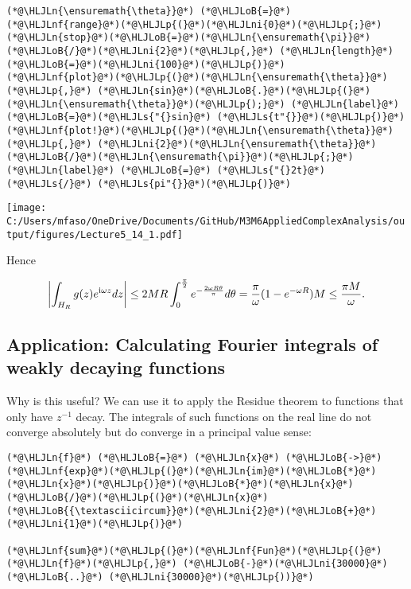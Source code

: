 \documentclass[12pt,landscape]{article}
\newcommand{\HLJLn}[1]{#1}
\newcommand{\HLJLnf}[1]{\textcolor[RGB]{66,102,213}{#1}}
\newcommand{\HLJLs}[1]{\textcolor[RGB]{201,61,57}{#1}}
\newcommand{\HLJLni}[1]{\textcolor[RGB]{59,151,46}{#1}}
\newcommand{\HLJLoB}[1]{\textcolor[RGB]{102,102,102}{\textbf{#1}}}
\newcommand{\HLJLp}[1]{#1}
\def\I{ {\rm i} }
\def\cent#1{\begin{center}#1\end{center} }
\begin{document}
{\begin{lstlisting}
(*@\HLJLn{\ensuremath{\theta}}@*) (*@\HLJLoB{=}@*) (*@\HLJLnf{range}@*)(*@\HLJLp{(}@*)(*@\HLJLni{0}@*)(*@\HLJLp{;}@*) (*@\HLJLn{stop}@*)(*@\HLJLoB{=}@*)(*@\HLJLn{\ensuremath{\pi}}@*)(*@\HLJLoB{/}@*)(*@\HLJLni{2}@*)(*@\HLJLp{,}@*) (*@\HLJLn{length}@*)(*@\HLJLoB{=}@*)(*@\HLJLni{100}@*)(*@\HLJLp{)}@*)
(*@\HLJLnf{plot}@*)(*@\HLJLp{(}@*)(*@\HLJLn{\ensuremath{\theta}}@*)(*@\HLJLp{,}@*) (*@\HLJLn{sin}@*)(*@\HLJLoB{.}@*)(*@\HLJLp{(}@*)(*@\HLJLn{\ensuremath{\theta}}@*)(*@\HLJLp{);}@*) (*@\HLJLn{label}@*)(*@\HLJLoB{=}@*)(*@\HLJLs{"{}sin}@*) (*@\HLJLs{t"{}}@*)(*@\HLJLp{)}@*)
(*@\HLJLnf{plot!}@*)(*@\HLJLp{(}@*)(*@\HLJLn{\ensuremath{\theta}}@*)(*@\HLJLp{,}@*) (*@\HLJLni{2}@*)(*@\HLJLn{\ensuremath{\theta}}@*)(*@\HLJLoB{/}@*)(*@\HLJLn{\ensuremath{\pi}}@*)(*@\HLJLp{;}@*) (*@\HLJLn{label}@*) (*@\HLJLoB{=}@*) (*@\HLJLs{"{}2t}@*) (*@\HLJLs{/}@*) (*@\HLJLs{pi"{}}@*)(*@\HLJLp{)}@*)
\end{lstlisting}

\cent{\texttt{[image: C:/Users/mfaso/OneDrive/Documents/GitHub/M3M6AppliedComplexAnalysis/output/figures/Lecture5\_14\_1.pdf]}}

Hence

\[
\left| \int_{H_R} g(z) e^{\I \omega z} dz \right|  \leq  2MR \int_0^{\pi\over 2} e^{- {2\omega R\theta \over \pi} } d\theta = {\pi \over \omega} (1 - e^{-\omega R}) M \leq {\pi M \over \omega}.
\]
\subsection{Application: Calculating Fourier integrals of weakly decaying functions}
Why is this useful? We can use it to apply the Residue theorem to functions that only have $z^{-1}$ decay. The integrals of such functions on the real line do not converge absolutely but do converge in a principal value sense:


\begin{lstlisting}
(*@\HLJLn{f}@*) (*@\HLJLoB{=}@*) (*@\HLJLn{x}@*) (*@\HLJLoB{->}@*) (*@\HLJLnf{exp}@*)(*@\HLJLp{(}@*)(*@\HLJLn{im}@*)(*@\HLJLoB{*}@*)(*@\HLJLn{x}@*)(*@\HLJLp{)}@*)(*@\HLJLoB{*}@*)(*@\HLJLn{x}@*)(*@\HLJLoB{/}@*)(*@\HLJLp{(}@*)(*@\HLJLn{x}@*)(*@\HLJLoB{{\textasciicircum}}@*)(*@\HLJLni{2}@*)(*@\HLJLoB{+}@*)(*@\HLJLni{1}@*)(*@\HLJLp{)}@*)

(*@\HLJLnf{sum}@*)(*@\HLJLp{(}@*)(*@\HLJLnf{Fun}@*)(*@\HLJLp{(}@*)(*@\HLJLn{f}@*)(*@\HLJLp{,}@*) (*@\HLJLoB{-}@*)(*@\HLJLni{30000}@*) (*@\HLJLoB{..}@*) (*@\HLJLni{30000}@*)(*@\HLJLp{))}@*)
\end{lstlisting}

}
\end{document}
